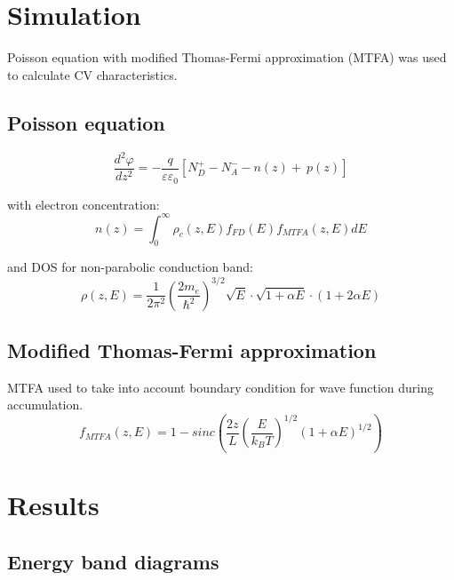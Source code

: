 \documentclass[final]{beamer}
\newcommand{\figfont}{\normalsize} %
\begin{document}
\begin{poster}
\section{Simulation} \justifying

Poisson equation with modified Thomas-Fermi approximation (MTFA) was used to calculate CV characteristics.
\vspace*{-2ex}

\subsection{Poisson equation}
\vspace*{-1ex}
    $$
        \frac{d^2\varphi}{dz^2} =
         -\frac{q}{\varepsilon\varepsilon_0}\left[N_D^+ - N_A^- - n(z) + \
          p(z)\right] 
    $$
    
    with electron concentration:
    $$
        n(z) = \int_{0}^{\infty}\rho_c(z,E) f_{FD}(E) f_{MTFA}(z,E)dE
    $$ 
    
    and  DOS for non-parabolic conduction band:  
    $$
        \rho \left(z,E\right) = \frac{1}{2\pi^2} \left(\frac{2m_{e}}{\hbar^2}\right)^{3/2} \!\!\! \sqrt{E} \cdot \sqrt{1+\alpha E} \cdot \left(1+ 2\alpha E \right)
    $$  
    

       
\subsection{Modified Thomas-Fermi approximation}
    MTFA used to take into account boundary condition for wave function during accumulation.  
    $$
    f_{MTFA}(z, E)  = 1 - sinc\left( \frac{2z}{L} \left(\frac{E}{k_BT}\right)^{1/2} \left(1+\alpha E\right)^{1/2}\right)
    $$
    
\newcolumn

\section{Results} \justifying
\subsection{Energy band diagrams}
        \centering{
        \figfont
        
        }
\vspace*{-4ex}


\end{poster}
\end{document}
